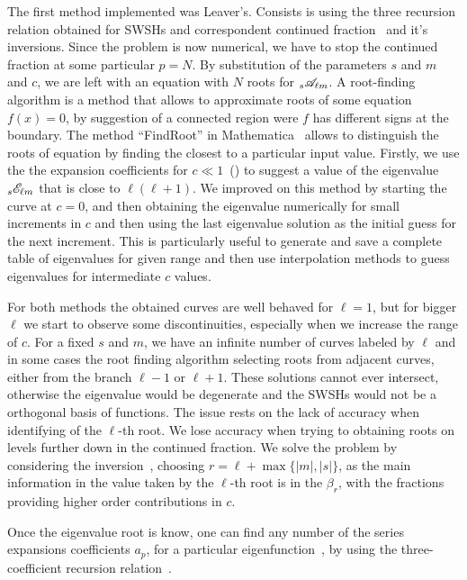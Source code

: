 The first method implemented was Leaver's.
Consists is using the three recursion relation obtained for SWSHs and correspondent continued fraction~ and it's inversions.
Since the problem is now numerical, we have to stop the continued fraction at some particular $p=N$.
By substitution of the parameters $s$ and $m$ and $c$, we are left with an equation with $N$ roots for $\uu[s]{\mathscr{A}}{\ell m}$.
A root-finding algorithm is a method that allows to approximate roots of some equation $f(x)=0$, by suggestion of a connected region were $f$ has different signs at the boundary.
The method ``FindRoot'' in Mathematica\texttrademark~ allows to distinguish the roots of equation by finding the closest to a particular input value.
Firstly, we use the the expansion coefficients for $c\ll 1$~() to suggest a value of the eigenvalue $\uu[s]{\mathscr{E}}{\ell m}$ that is close to $\ell(\ell+1)$.
We improved on this method by starting the curve at $c=0$, and then obtaining the eigenvalue numerically for small increments in $c$ and then using the last eigenvalue solution as the initial guess for the next increment.
This is particularly useful to generate and save a complete table of eigenvalues for given range and then use interpolation methods to guess eigenvalues for intermediate $c$ values.

For both methods the obtained curves are well behaved for $\ell=1$, but for bigger $\ell$ we start to observe some discontinuities, especially when we increase the range of $c$.
For a fixed $s$ and $m$, we have an infinite number of curves labeled by $\ell$ and in some cases the root finding algorithm selecting roots from adjacent curves, either from the branch $\ell-1$ or $\ell+1$.
These solutions cannot ever intersect, otherwise the eigenvalue would be degenerate and the SWSHs would not be a orthogonal basis of functions.
The issue rests on the lack of accuracy when identifying of the $\ell$-th root.
We lose accuracy when trying to obtaining roots on levels further down in the continued fraction.
We solve the problem by considering the inversion~, choosing $r=\ell+\max\{|m|,|s|\}$, as the main information in the value taken by the $\ell$-th root is in the $\beta_r$, with the fractions providing higher order contributions in $c$.

Once the eigenvalue root is know, one can find any number of the series expansions coefficients $a_p$, for a particular eigenfunction~, by using the three-coefficient recursion relation~.


